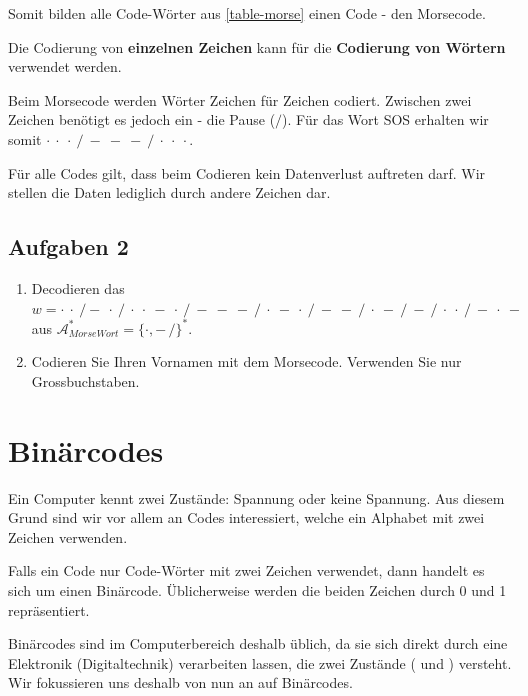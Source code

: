 Somit bilden alle Code-Wörter aus \autoref{table-morse} einen Code - den Morsecode.

\begin{important}
Die Codierung von \textbf{einzelnen Zeichen} kann für die \textbf{Codierung von Wörtern} verwendet werden.
\end{important}

\begin{example}
Beim Morsecode werden Wörter Zeichen für Zeichen codiert. Zwischen zwei Zeichen benötigt es jedoch ein  - die Pause ($/$). Für das Wort SOS erhalten wir somit $\cdot~\cdot~\cdot~/~-~-~-~/~\cdot~\cdot~\cdot$.
\end{example}

\begin{important}
Für alle Codes gilt, dass beim Codieren kein Datenverlust auftreten darf. Wir stellen die Daten lediglich durch andere Zeichen dar.
\end{important}

\subsection{Aufgaben 2}

\begin{enumerate}
\item Decodieren das $w = \cdot~\cdot~/-~\cdot~/~\cdot~\cdot~-~\cdot~/~-~-~-~/~\cdot~-~\cdot~/~-~-~/~\cdot~-~/~-~/~\cdot~\cdot~/~-~\cdot~-$ aus $\mathscr{A}_{MorseWort}^*=\{\cdot, -\, /\}^*$.
\item Codieren Sie Ihren Vornamen mit dem Morsecode. Verwenden Sie nur Grossbuchstaben.
\end{enumerate}

\section{Binärcodes}

Ein Computer kennt zwei Zustände: Spannung oder keine Spannung. Aus diesem Grund sind wir vor allem an Codes interessiert, welche ein Alphabet mit zwei Zeichen verwenden.

\begin{definition}[Binärcode]
Falls ein Code nur Code-Wörter mit zwei Zeichen verwendet, dann handelt es sich um einen Binärcode. Üblicherweise werden die beiden Zeichen durch 0 und 1 repräsentiert.
\end{definition}

Binärcodes sind im Computerbereich deshalb üblich, da sie sich direkt durch eine Elektronik (Digitaltechnik) verarbeiten lassen, die zwei Zustände ( und ) versteht. Wir fokussieren uns deshalb von nun an auf Binärcodes.

